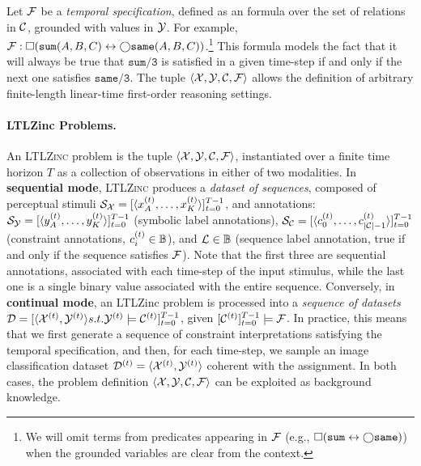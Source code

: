 %
Let ${\mathcal{F}}$ be a \textit{temporal specification}, defined as an \LTLf formula over the set of relations in ${\mathcal{C}}$,  grounded with values in ${\mathcal{Y}}$. For example, ${\mathcal{F}}: \Box(\texttt{sum}(A,B,C) \leftrightarrow \bigcirc \texttt{same}(A,B,C))$.\footnote{We will omit terms from predicates appearing in ${\mathcal{F}}$ (e.g., $\Box(\texttt{sum} \leftrightarrow \bigcirc \texttt{same})$) when the grounded variables are clear from the context.} This formula models the fact that it will always be true that $\texttt{sum/3}$ is satisfied in a given time-step if and only if the next one satisfies $\texttt{same/3}$. 
The tuple $\langle {\mathcal{X}}, {\mathcal{Y}}, {\mathcal{C}}, {\mathcal{F}} \rangle$ allows the definition of arbitrary finite-length linear-time first-order reasoning settings.

\paragraph{LTLZinc Problems.} An \textsc{LTLZinc} problem is the tuple $\langle {\mathcal{X}}, {\mathcal{Y}}, {\mathcal{C}}, {\mathcal{F}}\rangle$, instantiated over a finite time horizon $T$ as a collection of observations in either of two modalities.
In \textbf{sequential mode}, \textsc{LTLZinc} produces a \textit{dataset of sequences}, composed of perceptual stimuli ${\mathcal{S}}_{\mathcal{X}} = [\langle x_A^{(t)}, \dots, x_{K}^{(t)}\rangle]_{t=0}^{T-1}$, and annotations: ${\mathcal{S}}_{\mathcal{Y}} = [\langle y_A^{(t)}, \dots, y_{K}^{(t)}\rangle]_{t=0}^{T-1}$ (symbolic label annotations), ${\mathcal{S}}_{\mathcal{C}} = [\langle c_0^{(t)}, \dots, c_{|{\mathcal{C}}|-1}^{(t)}\rangle]_{t=0}^{T-1}$ (constraint annotations, $c_i^{(t)} \in {\mathbb{B}}$), and ${\mathcal{L}} \in {\mathbb{B}}$ (sequence label annotation, true if and only if the sequence satisfies ${\mathcal{F}}$). Note that the first three are sequential annotations, associated with each time-step of the input stimulus, while the last one is a single binary value associated with the entire sequence. 
%
Conversely, in \textbf{continual mode}, an LTLZinc problem is processed into a \textit{sequence of datasets} $\mathcal{D} = [\langle {\mathcal{X}}^{(t)}, {\mathcal{Y}}^{(t)} \rangle s.t. {\mathcal{Y}}^{(t)} \models {\mathcal{C}}^{(t)}]_{t=0}^{T-1}$, given $[{\mathcal{C}}^{(t)}]_{t=0}^{T-1} \models {\mathcal{F}}$.
In practice, this means that we first generate a sequence of constraint interpretations satisfying the temporal specification, and then, for each time-step, we sample an image classification dataset ${\mathcal{D}}^{(t)} = \langle {\mathcal{X}}^{(t)}, {\mathcal{Y}}^{(t)}\rangle$ coherent with the assignment.
%
In both cases, the problem definition $\langle {\mathcal{X}}, {\mathcal{Y}}, {\mathcal{C}}, {\mathcal{F}}\rangle$ can be exploited as background knowledge.


